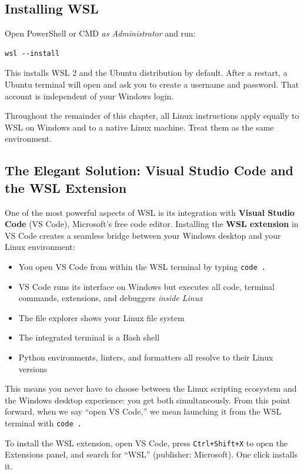 \subsection{Installing WSL}

Open PowerShell or CMD \emph{as Administrator} and run:

\begin{lstlisting}[style=windowsStyle, caption={Installing WSL from PowerShell}]
wsl --install
\end{lstlisting}

This installs WSL 2 and the Ubuntu distribution by default. After a
restart, a Ubuntu terminal will open and ask you to create a username and
password. That account is independent of your Windows login.

\begin{notebox}
Throughout the remainder of this chapter, all Linux instructions apply
equally to WSL on Windows and to a native Linux machine. Treat them as the
same environment.
\end{notebox}

\subsection{The Elegant Solution: Visual Studio Code and the WSL Extension}
\label{subsec:vscode-wsl}

One of the most powerful aspects of WSL is its integration with
\textbf{Visual Studio Code} (VS Code), Microsoft's free code editor.
Installing the \textbf{WSL extension} in VS Code creates a seamless bridge
between your Windows desktop and your Linux environment:

\begin{itemize}
  \item You open VS Code from within the WSL terminal by typing \texttt{code .}
  \item VS Code runs its interface on Windows but executes all code,
        terminal commands, extensions, and debuggers \emph{inside Linux}
  \item The file explorer shows your Linux file system
  \item The integrated terminal is a Bash shell
  \item Python environments, linters, and formatters all resolve to their
        Linux versions
\end{itemize}

This means you never have to choose between the Linux scripting ecosystem
and the Windows desktop experience: you get both simultaneously. From this
point forward, when we say ``open VS Code,'' we mean launching it from
the WSL terminal with \texttt{code .}

\begin{tipbox}
To install the WSL extension, open VS Code, press
\texttt{Ctrl+Shift+X} to open the Extensions panel, and search for
``WSL'' (publisher: Microsoft). One click installs it.
\end{tipbox}

